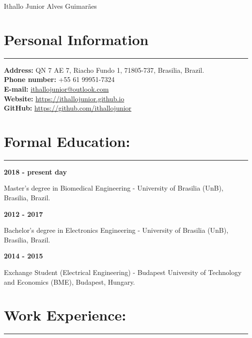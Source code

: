 \documentclass[11pt]{article}
\begin{document}
\begin{center}
\huge{Ithallo Junior Alves Guimarães}
\end{center}

\section{Personal Information}
\hrule \vspace{0.1cm}

\begin{addmargin}{0.5cm}

\textbf{Address:}  QN 7 AE 7, Riacho Fundo 1, 71805-737, Brasilia, Brazil. \\
\textbf{Phone number:}  +55 61 99951-7324 \\
\textbf{E-mail:}   \href{maito:ithallojunior@outlook.com}{ithallojunior@outlook.com} \\
\textbf{Website:}  \url{https://ithallojunior.github.io}  \\
\textbf{GitHub:} \url{https://github.com/ithallojunior}

\end{addmargin}


\section{Formal Education:}
\hrule \vspace{0.1cm}

\textbf{2018 - present day}
\begin{addmargin}{0.5cm}
Master's degree in Biomedical Engineering - University of Brasilia (UnB), Brasilia, Brazil. \\
\end{addmargin}

\textbf{2012 - 2017}
\begin{addmargin}{0.5cm}
Bachelor's degree in Electronics Engineering - University of Brasilia (UnB), Brasilia, Brazil. \\
\end{addmargin}

\textbf{2014 - 2015} 
\begin{addmargin}{0.5cm}
Exchange Student (Electrical Engineering) - Budapest University of Technology and Economics (BME), Budapest, Hungary. 
\end{addmargin}

\section{Work Experience:}
\hrule \vspace{0.1cm}
\end{document}
